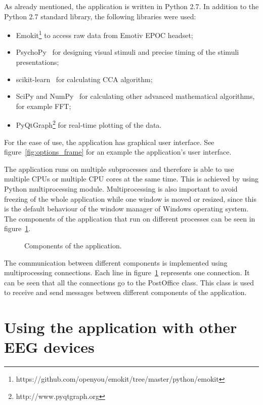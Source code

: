 As already mentioned, the application is written in Python 2.7. In addition to the Python 2.7 standard library, the following libraries were used:
\begin{itemize}
	\item Emokit\footnote{https://github.com/openyou/emokit/tree/master/python/emokit} to access raw data from Emotiv EPOC headset;
	\item PsychoPy~\cite{psychopy} for designing visual stimuli and precise timing of the stimuli presentations;
	\item scikit-learn~\cite{scikit-learn} for calculating \gls{CCA} algorithm;
	\item SciPy and NumPy~\cite{scipy} for calculating other advanced mathematical algorithms, for example \gls{FFT};
	\item PyQtGraph\footnote{http://www.pyqtgraph.org} for real-time plotting of the data.
\end{itemize} For the ease of use, the application has graphical user interface. See figure~\ref{fig:options_frame} for an example the application's user interface.

The application runs on multiple subprocesses and therefore is able to use multiple \glspl{CPU} or multiple \gls{CPU} cores at the same time. This is achieved by using Python multiprocessing module. Multiprocessing is also important to avoid freezing of the whole application while one window is moved or resized, since this is the default behaviour of the window manager of Windows operating system. The components of the application that run on different processes can be seen in figure~\ref{fig:class_diagram}.

\begin{figure}[h!]
	\centering
	
	\caption{Components of the application.}
	\label{fig:class_diagram}
\end{figure}

The communication between different components is implemented using multiprocessing connections. Each line in figure~\ref{fig:class_diagram} represents one connection. It can be seen that all the connections go to the PostOffice class. This class is used to receive and send messages between different components of the application.

\section{Using the application with other EEG devices}
\label{sec:different_devices}

